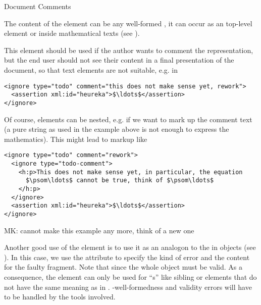 \begin{omgroup}[id=omdoc-infrastructure,short=Document Infrastructure]
\begin{omgroup}[id=comment]{Document Comments}
\begin{module}[id=comments]
\begin{definition}[id=ignore.def]
  The content of the {} element can be any well-formed \omdoc, it can
  occur as an \omdoc top-level element or inside mathematical texts (see
  ).
\end{definition}
This element should be used if the author wants to comment the \omdoc representation,
but the end user should not see their content in a final presentation of the document, so
that \omdoc text elements are not suitable, e.g. in

\begin{lstlisting}[numbers=none,index={ignore},mathescape]
<ignore type="todo" comment="this does not make sense yet, rework">
  <assertion xml:id="heureka">$\ldots$</assertion>
</ignore>
\end{lstlisting}

Of course,  elements can be nested, e.g. if we want to mark up
the comment text (a pure string as used in the example above is not enough to
express the mathematics). This might lead to markup like 

\begin{lstlisting}[label=nested-ignore,numbers=none,index={ignore},mathescape]
<ignore type="todo" comment="rework">
  <ignore type="todo-comment">
    <h:p>This does not make sense yet, in particular, the equation 
      $\psom\ldots$ cannot be true, think of $\psom\ldots$
    </h:p>
  </ignore>
  <assertion xml:id="heureka">$\ldots$</assertion>
</ignore>
\end{lstlisting}

\begin{oldpart}{MK: cannot make this example any more, think of a new one}
\begin{example}
  Another good use of the  element is to use it as an analogon to the
  {} in {\openmath} objects (see ). In
  this case, we use the  attribute to specify the kind of error
  and the content for the faulty \omdoc fragment. Note that since the whole object must
  be {\xml} valid. As a consequence, the  element can only be used for
  ``{s}'' like sibling  or 
  elements that do not have the same meaning as in
  {}. {\xml}-well-formedness and validity errors will have to be
  handled by the {\xml} tools involved.


\end{example}
\end{oldpart}
\end{module}
\end{omgroup}
\end{omgroup}
